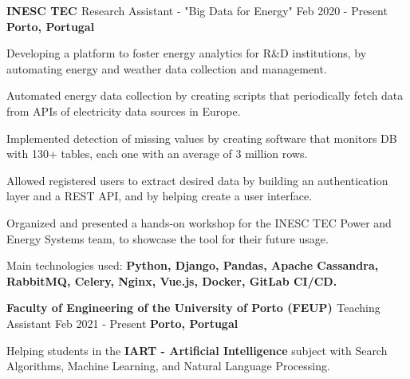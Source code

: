 

\begin{cventries}

  \cventry
    {\textbf{INESC TEC \href{https://www.inesctec.pt/en}{\faExternalLink}}} %
    {Research Assistant - "Big Data for Energy"} %
    {Feb 2020 - Present} %
    {\textbf{Porto, Portugal}} %
    {
      \begin{cvitems} %
        \item {Developing a platform to foster energy analytics for R\&D institutions, by automating energy and weather data collection and management.}
        \item {Automated energy data collection by creating scripts that periodically fetch data from APIs of electricity data sources in Europe.}
        \item {Implemented detection of missing values by creating software that monitors DB with 130+ tables, each one with an average of 3 million rows.}
        \item {Allowed registered users to extract desired data by building an authentication layer and a REST API, and by helping create a user interface.}
        \item {Organized and presented a hands-on workshop for the INESC TEC Power and Energy Systems team, to showcase the tool for their future usage.}
        \item {Main technologies used: \textbf{Python, Django, Pandas, Apache Cassandra, RabbitMQ, Celery, Nginx, Vue.js, Docker, GitLab CI/CD.}}
      \end{cvitems}
    }

  \cventry
     {\textbf{Faculty of Engineering of the University of Porto (FEUP) \href{https://sigarra.up.pt/feup/pt/web_page.inicial}{\faExternalLink}}} %
    {Teaching Assistant} %
    {Feb 2021 - Present} %
    {\textbf{Porto, Portugal}} %
    {
      \begin{cvitems} %
        \item {Helping students in the \textbf{IART - Artificial Intelligence} subject with Search Algorithms, Machine Learning, and Natural Language Processing.}
      \end{cvitems}
    }


\end{cventries}

